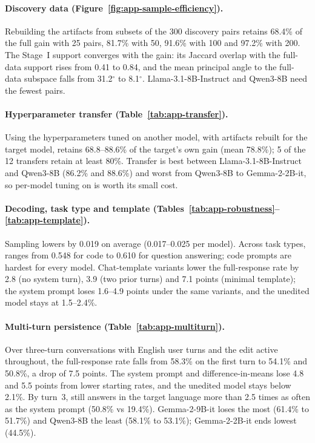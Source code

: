 \paragraph{Discovery data (Figure~\ref{fig:app-sample-efficiency}).} Rebuilding the artifacts from subsets of the 300 discovery pairs retains 68.4\% of the full gain with 25 pairs, 81.7\% with 50, 91.6\% with 100 and 97.2\% with 200. The Stage~I support converges with the gain: its Jaccard overlap with the full-data support rises from 0.41 to 0.84, and the mean principal angle to the full-data subspace falls from 31.2$^\circ$ to 8.1$^\circ$. Llama-3.1-8B-Instruct and Qwen3-8B need the fewest pairs.

\paragraph{Hyperparameter transfer (Table~\ref{tab:app-transfer}).} Using the hyperparameters tuned on another model, with artifacts rebuilt for the target model, retains 68.8--88.6\% of the target's own gain (mean 78.8\%); 5 of the 12 transfers retain at least 80\%. Transfer is best between Llama-3.1-8B-Instruct and Qwen3-8B (86.2\% and 88.6\%) and worst from Qwen3-8B to Gemma-2-2B-it, so per-model tuning on \Ddev is worth its small cost.

\paragraph{Decoding, task type and template (Tables~\ref{tab:app-robustness}--\ref{tab:app-template}).} Sampling lowers  by 0.019 on average (0.017--0.025 per model). Across \nocue task types,  ranges from 0.548 for code to 0.610 for question answering; code prompts are hardest for every model. Chat-template variants lower the \foxp full-response rate by 2.8 (no system turn), 3.9 (two prior turns) and 7.1 points (minimal template); the system prompt loses 1.6--4.9 points under the same variants, and the unedited model stays at 1.5--2.4\%.

\paragraph{Multi-turn persistence (Table~\ref{tab:app-multiturn}).} Over three-turn conversations with English user turns and the edit active throughout, the \foxp full-response rate falls from 58.3\% on the first turn to 54.1\% and 50.8\%, a drop of 7.5 points. The system prompt and difference-in-means lose 4.8 and 5.5 points from lower starting rates, and the unedited model stays below 2.1\%. By turn~3, \foxp still answers in the target language more than 2.5 times as often as the system prompt (50.8\% vs 19.4\%). Gemma-2-9B-it loses the most (61.4\% to 51.7\%) and Qwen3-8B the least (58.1\% to 53.1\%); Gemma-2-2B-it ends lowest (44.5\%).

